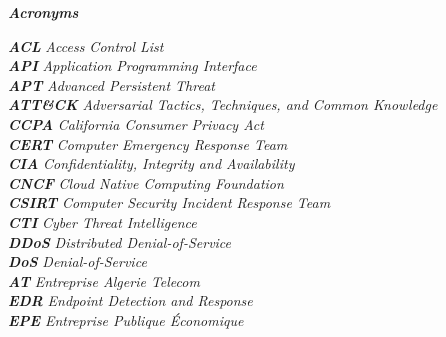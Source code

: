 \begin{center}
    {\Large \textbf{\textit{Acronyms}}}
\end{center}

\vspace{0.5cm}

\noindent
\textbf{\textit{ACL}} \hspace{0.5cm} \textit{Access Control List} \\
\textbf{\textit{API}} \hspace{0.5cm} \textit{Application Programming Interface} \\
\textbf{\textit{APT}} \hspace{0.5cm} \textit{Advanced Persistent Threat} \\
\textbf{\textit{ATT\&CK}} \hspace{0.5cm} \textit{Adversarial Tactics, Techniques, and Common Knowledge} \\
\textbf{\textit{CCPA}} \hspace{0.5cm} \textit{California Consumer Privacy Act} \\
\textbf{\textit{CERT}} \hspace{0.5cm} \textit{Computer Emergency Response Team} \\
\textbf{\textit{CIA}} \hspace{0.5cm} \textit{Confidentiality, Integrity and Availability} \\
\textbf{\textit{CNCF}} \hspace{0.5cm} \textit{Cloud Native Computing Foundation} \\
\textbf{\textit{CSIRT}} \hspace{0.5cm} \textit{Computer Security Incident Response Team} \\
\textbf{\textit{CTI}} \hspace{0.5cm} \textit{Cyber Threat Intelligence} \\
\textbf{\textit{DDoS}} \hspace{0.5cm} \textit{Distributed Denial-of-Service} \\
\textbf{\textit{DoS}} \hspace{0.5cm} \textit{Denial-of-Service} \\
\textbf{\textit{AT}} \hspace{0.5cm} \textit{Entreprise Algerie Telecom} \\
\textbf{\textit{EDR}} \hspace{0.5cm} \textit{Endpoint Detection and Response} \\
\textbf{\textit{EPE}} \hspace{0.5cm} \textit{Entreprise Publique Économique} \\
